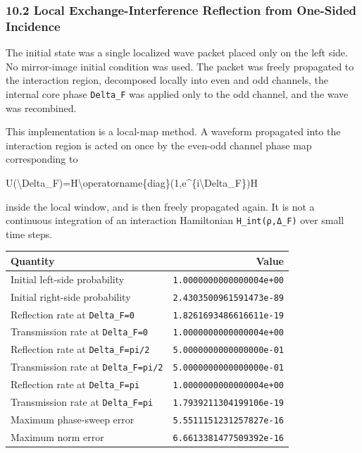 \documentclass[
  a4paper,
]{article}
\newenvironment{Shaded}{}{}
\newcommand{\NormalTok}[1]{#1}
\newcounter{none} %
\begin{document}
\subsubsection{10.2 Local Exchange-Interference Reflection from
One-Sided
Incidence}\label{local-exchange-interference-reflection-from-one-sided-incidence}

The initial state was a single localized wave packet placed only on the
left side. No mirror-image initial condition was used. The packet was
freely propagated to the interaction region, decomposed locally into
even and odd channels, the internal core phase \texttt{Delta\_F} was
applied only to the odd channel, and the wave was recombined.

This implementation is a local-map method. A waveform propagated into
the interaction region is acted on once by the even-odd channel phase
map corresponding to

\begin{Shaded}
\begin{Highlighting}[]
\NormalTok{U(\textbackslash{}Delta\_F)=H\textbackslash{}operatorname\{diag\}(1,e\^{}\{i\textbackslash{}Delta\_F\})H}
\end{Highlighting}
\end{Shaded}

inside the local window, and is then freely propagated again. It is not
a continuous integration of an interaction Hamiltonian
\texttt{H\_int(ρ,Δ\_F)} over small time steps.

{\def\LTcaptype{none} %
\begin{longtable}[]{@{}lr@{}}
\toprule\noalign{}
Quantity & Value \\
\midrule\noalign{}
\endhead
\bottomrule\noalign{}
\endlastfoot
Initial left-side probability & \texttt{1.0000000000000004e+00} \\
Initial right-side probability & \texttt{2.4303500961591473e-89} \\
Reflection rate at \texttt{Delta\_F=0} &
\texttt{1.8261693486616611e-19} \\
Transmission rate at \texttt{Delta\_F=0} &
\texttt{1.0000000000000004e+00} \\
Reflection rate at \texttt{Delta\_F=pi/2} &
\texttt{5.0000000000000000e-01} \\
Transmission rate at \texttt{Delta\_F=pi/2} &
\texttt{5.0000000000000000e-01} \\
Reflection rate at \texttt{Delta\_F=pi} &
\texttt{1.0000000000000004e+00} \\
Transmission rate at \texttt{Delta\_F=pi} &
\texttt{1.7939211304199106e-19} \\
Maximum phase-sweep error & \texttt{5.5511151231257827e-16} \\
Maximum norm error & \texttt{6.6613381477509392e-16} \\
\end{longtable}
}
\end{document}

